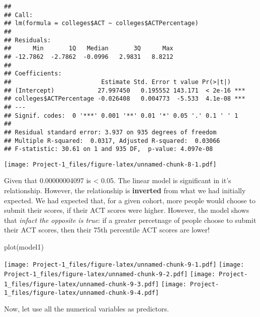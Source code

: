 \documentclass[
]{article}
\newenvironment{Shaded}{\begin{snugshade}}{\end{snugshade}}
\newcommand{\AttributeTok}[1]{\textcolor[rgb]{0.77,0.63,0.00}{#1}}
\newcommand{\FunctionTok}[1]{\textcolor[rgb]{0.00,0.00,0.00}{#1}}
\newcommand{\NormalTok}[1]{#1}
\newcommand{\SpecialCharTok}[1]{\textcolor[rgb]{0.00,0.00,0.00}{#1}}
\newcommand{\StringTok}[1]{\textcolor[rgb]{0.31,0.60,0.02}{#1}}
\begin{document}
\begin{verbatim}
## 
## Call:
## lm(formula = colleges$ACT ~ colleges$ACTPercentage)
## 
## Residuals:
##      Min       1Q   Median       3Q      Max 
## -12.7862  -2.7862  -0.0996   2.9831   8.8212 
## 
## Coefficients:
##                         Estimate Std. Error t value Pr(>|t|)    
## (Intercept)            27.997450   0.195552 143.171  < 2e-16 ***
## colleges$ACTPercentage -0.026408   0.004773  -5.533  4.1e-08 ***
## ---
## Signif. codes:  0 '***' 0.001 '**' 0.01 '*' 0.05 '.' 0.1 ' ' 1
## 
## Residual standard error: 3.937 on 935 degrees of freedom
## Multiple R-squared:  0.0317, Adjusted R-squared:  0.03066 
## F-statistic: 30.61 on 1 and 935 DF,  p-value: 4.097e-08
\end{verbatim}

\begin{Shaded}
\end{Shaded}

\texttt{[image: Project-1\_files/figure-latex/unnamed-chunk-8-1.pdf]}

Given that 0.00000004097 is \textless{} 0.05. The linear model is
significant in it's relationship. However, the relationship is
\textbf{inverted} from what we had initially expected. We had expected
that, for a given cohort, more people would choose to submit their
scores, if their ACT scores were higher. However, the model shows that
\emph{infact the opposite is true}: if a greater percetnage of people
choose to submit their ACT scores, then their 75th percentile ACT scores
are lower!

\begin{Shaded}
\begin{Highlighting}[]
\FunctionTok{plot}\NormalTok{(model1)}
\end{Highlighting}
\end{Shaded}

\texttt{[image: Project-1\_files/figure-latex/unnamed-chunk-9-1.pdf]}
\texttt{[image: Project-1\_files/figure-latex/unnamed-chunk-9-2.pdf]}
\texttt{[image: Project-1\_files/figure-latex/unnamed-chunk-9-3.pdf]}
\texttt{[image: Project-1\_files/figure-latex/unnamed-chunk-9-4.pdf]}

Now, let use all the numerical variables as predictors.
\end{document}
